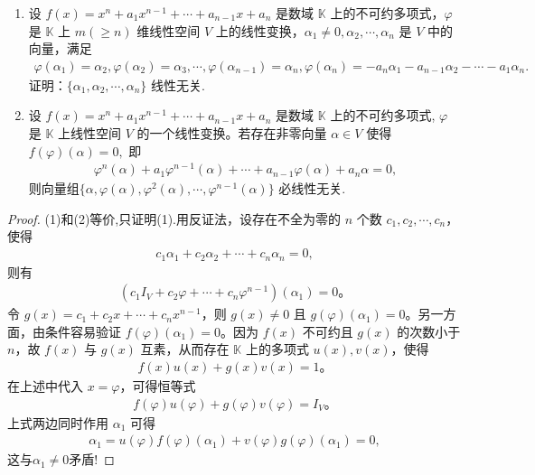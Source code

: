 \documentclass[../../main.tex]{subfiles}%
\begin{document}
\begin{proposition}\label{proposition:不可约多项式与向量组线性无关}
\begin{enumerate}[(1)]
\item 设 $f(x) = x^n + a_1 x^{n-1} + \cdots + a_{n-1} x + a_n$ 是数域 $\mathbb{K}$ 上的不可约多项式，$\varphi$ 是 $\mathbb{K}$ 上 $m(\geqslant n)$ 维线性空间 $V$ 上的线性变换，$\alpha_1 \neq 0, \alpha_2, \cdots, \alpha_n$ 是 $V$ 中的向量，满足
\begin{align*}
\varphi (\alpha _1)=\alpha _2,\varphi (\alpha _2)=\alpha _3,\cdots ,\varphi (\alpha _{n-1})=\alpha _n,\varphi (\alpha _n)=-a_n\alpha _1-a_{n-1}\alpha _2-\cdots -a_1\alpha _n.
\end{align*}
证明：$\{\alpha_1, \alpha_2, \cdots, \alpha_n\}$ 线性无关.

\item 设 $f(x) = x^n + a_1 x^{n-1} + \cdots + a_{n-1} x + a_n$ 是数域 $\mathbb{K}$ 上的不可约多项式, $\varphi$ 是 $\mathbb{K}$ 上线性空间 $V$ 的一个线性变换。若存在非零向量 $\alpha \in V$ 使得
$f(\varphi)(\alpha) = 0,$
即
\begin{align*}
\varphi^n(\alpha) + a_1 \varphi^{n-1}(\alpha) + \cdots + a_{n-1}\varphi(\alpha) + a_n \alpha = 0,
\end{align*}
则向量组$\{\alpha, \varphi(\alpha), \varphi^2(\alpha), \cdots, \varphi^{n-1}(\alpha)\}$
必线性无关.
\end{enumerate}
\end{proposition}
\begin{proof}
(1)和(2)等价,只证明(1).用反证法，设存在不全为零的 $n$ 个数 $c_1, c_2, \cdots, c_n$，使得
\begin{align*}
c_1 \alpha_1 + c_2 \alpha_2 + \cdots + c_n \alpha_n = 0,
\end{align*}
则有
\begin{align*}
(c_1 I_V + c_2 \varphi + \cdots + c_n \varphi^{n-1})(\alpha_1) = 0。
\end{align*}
令 $g(x) = c_1 + c_2 x + \cdots + c_n x^{n-1}$，则 $g(x) \neq 0$ 且 $g(\varphi)(\alpha_1) = 0$。另一方面，由条件容易验证 $f(\varphi)(\alpha_1) = 0$。因为 $f(x)$ 不可约且 $g(x)$ 的次数小于 $n$，故 $f(x)$ 与 $g(x)$ 互素，从而存在 $\mathbb{K}$ 上的多项式 $u(x), v(x)$，使得
\begin{align*}
f(x)u(x) + g(x)v(x) = 1。
\end{align*}
在上述中代入 $x = \varphi$，可得恒等式
\begin{align*}
f(\varphi)u(\varphi) + g(\varphi)v(\varphi) = I_V。
\end{align*}
上式两边同时作用 $\alpha_1$ 可得
\begin{align*}
\alpha_1 = u(\varphi)f(\varphi)(\alpha_1) + v(\varphi)g(\varphi)(\alpha_1) = 0,
\end{align*}
这与$\alpha_1\ne 0$矛盾!
\end{proof}
\end{document}
